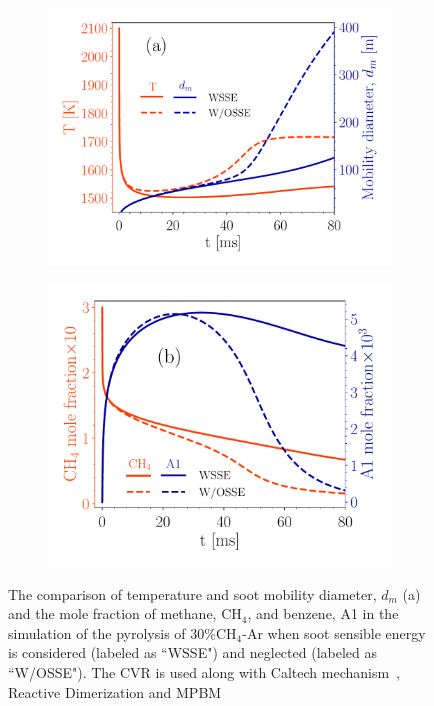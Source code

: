\begin{figure}[H]
	\centering
	\begin{subfigure}[t]{0.43\textwidth}
		\includegraphics[width=1\textwidth]{Figures/Theory/sse_temp_dm.pdf}
	\end{subfigure}
	\begin{subfigure}[t]{0.4\textwidth}
		\includegraphics[width=1\textwidth]{Figures/Theory/sse_gasresid.pdf}
	\end{subfigure}
	\caption{The comparison of temperature and soot mobility diameter, $d_m$ (a) and the mole fraction of methane, $\mathrm{CH_4}$, and benzene, A1 in the simulation of the pyrolysis of 30\%$\mathrm{CH_4}$-Ar when soot sensible energy is considered (labeled as ``WSSE") and neglected (labeled as ``W/OSSE"). The CVR is used along with Caltech mechanism~\citep{blanquart2009chemical}, Reactive Dimerization and MPBM}
	\label{fig:sseeffect}
\end{figure}

